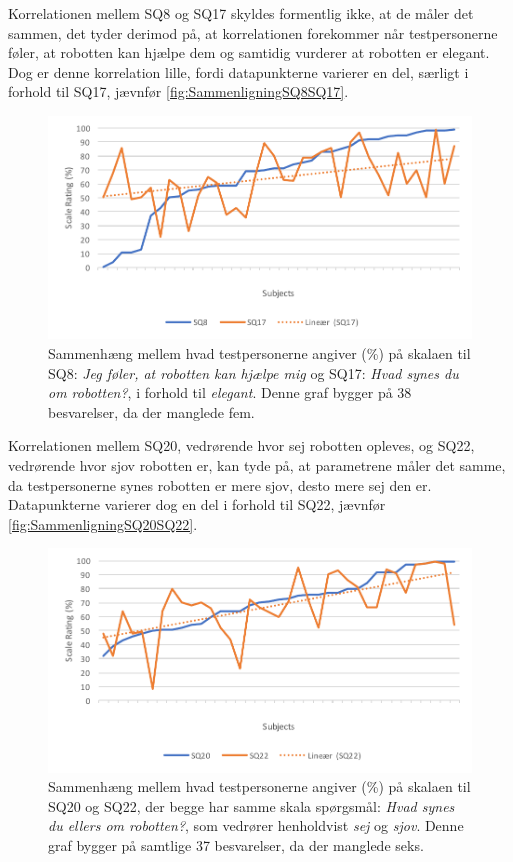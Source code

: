 \noindent
%
Korrelationen mellem SQ8 og SQ17 skyldes formentlig ikke, at de måler det sammen, det tyder derimod på, at korrelationen forekommer når testpersonerne føler, at robotten kan hjælpe dem og samtidig vurderer at robotten er elegant. Dog er denne korrelation lille, fordi datapunkterne varierer en del, særligt i forhold til SQ17, jævnfør \autoref{fig:SammenligningSQ8SQ17}.  
%
\begin{figure}[H]
	\centering
	\includegraphics[width=\textwidth]{Figure/Korrelationsgrafer/SQ8+SQ17}
	\caption{Sammenhæng mellem hvad testpersonerne angiver (\%) på skalaen til SQ8: \textit{Jeg føler, at robotten kan hjælpe mig} og SQ17: \textit{Hvad synes du om robotten?}, i forhold til \textit{elegant}. Denne graf bygger på 38 besvarelser, da der manglede fem.}
	\label{fig:SammenligningSQ8SQ17}
\end{figure}
\noindent
%
Korrelationen mellem SQ20, vedrørende hvor sej robotten opleves, og SQ22, vedrørende hvor sjov robotten er, kan tyde på, at parametrene måler det samme, da testpersonerne synes robotten er mere sjov, desto mere sej den er. Datapunkterne varierer dog en del i forhold til SQ22, jævnfør \autoref{fig:SammenligningSQ20SQ22}.  
%
\begin{figure}[H]
	\centering
	\includegraphics[width=\textwidth]{Figure/Korrelationsgrafer/SQ20+SQ22}
	\caption{Sammenhæng mellem hvad testpersonerne angiver (\%) på skalaen til SQ20 og SQ22, der begge har samme skala spørgsmål: \textit{Hvad synes du ellers om robotten?}, som vedrører henholdvist \textit{sej} og \textit{sjov}. Denne graf bygger på samtlige 37 besvarelser, da der manglede seks.}
	\label{fig:SammenligningSQ20SQ22}
\end{figure}
